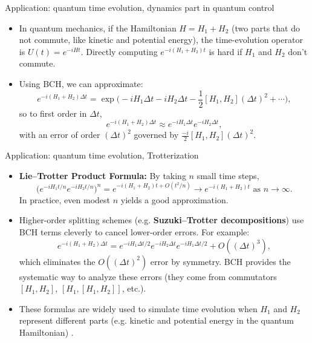 \documentclass{beamer}
\begin{document}
\begin{frame}{Application: quantum time evolution, dynamics part in quantum control}
\begin{itemize}
\item In quantum mechanics, if the Hamiltonian $H = H_1 + H_2$ (two parts that do not commute, like kinetic and potential energy), the time-evolution operator is $U(t) = e^{-i H t}$. Directly computing $e^{-i(H_1+H_2)t}$ is hard if $H_1$ and $H_2$ don’t commute.
\item Using BCH, we can approximate:
\[  
e^{-i(H_1+H_2)\Delta t} = \exp\Big(-i H_1 \Delta t - i H_2 \Delta t - \frac{1}{2}[H_1, H_2](\Delta t)^2 + \cdots \Big) ,
\]
so to first order in $\Delta t$,
\[
e^{-i(H_1+H_2)\Delta t} \approx e^{-iH_1 \Delta t} e^{-iH_2 \Delta t},
\]
with an error of order $(\Delta t)^2$ governed by $\frac{-i}{2}[H_1,H_2](\Delta t)^2$.
\end{itemize}
\end{frame}


\begin{frame}{Application: quantum time evolution, Trotterization}
\begin{itemize}
\item \textbf{Lie–Trotter Product Formula:} By taking $n$ small time steps,
\[  
\Big(e^{-iH_1 t/n} e^{-iH_2 t/n}\Big)^n = e^{-i(H_1+H_2)t + O(t^2/n)} \to e^{-i(H_1+H_2)t} \text{ as } n\to\infty .
\]
In practice, even modest $n$ yields a good approximation.
\item Higher-order splitting schemes (e.g. \textbf{Suzuki–Trotter decompositions}) use BCH terms cleverly to cancel lower-order errors. For example:
\[  
e^{-i(H_1+H_2)\Delta t} = e^{-iH_1 \Delta t/2} e^{-iH_2 \Delta t} e^{-iH_1 \Delta t/2} + O((\Delta t)^3) ,
\]
which eliminates the $O((\Delta t)^2)$ error by symmetry. BCH provides the systematic way to analyze these errors (they come from commutators $[H_1,H_2]$, $[H_1,[H_1,H_2]]$, etc.).
\item These formulas are widely used to simulate time evolution when $H_1$ and $H_2$ represent different parts (e.g. kinetic and potential energy in the quantum Hamiltonian) .
\end{itemize}
\end{frame}
\end{document}
